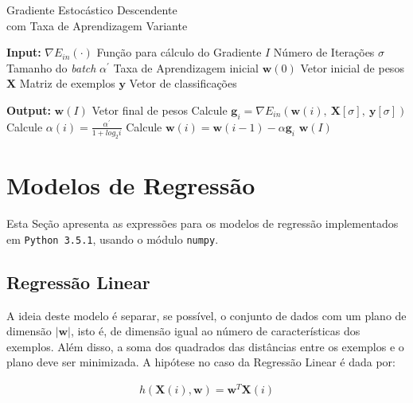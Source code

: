 \documentclass[a4paper, 12pt]{article}
\begin{document}
\begin{algorithm}[htpb]
    \caption{Gradiente Estocástico Descendente \\ com Taxa de Aprendizagem Variante}
    \label{alg:GSD}
    \begin{algorithmic}[1]
        \Statex \item[\textbf{Input:}]
        \Statex $\nabla{}E_{in}(\cdot)$ \Comment Função para cálculo do Gradiente
        \Statex $I$ \Comment Número de Iterações
        \Statex $\sigma$ \Comment Tamanho do \textit{batch}
        \Statex $\alpha^{\prime}$ \Comment Taxa de Aprendizagem inicial
        \Statex $\textbf{w}(0)$ \Comment Vetor inicial de pesos
        \Statex $\textbf{X}$ \Comment Matriz de exemplos
        \Statex $\textbf{y}$ \Comment Vetor de classificações
        \Statex \item[\textbf{Output:}]
        \Statex $\textbf{w}(I)$ \Comment Vetor final de pesos
        \Statex
        \State Calcule $\textbf{g}_i = \nabla{}E_{in}(\textbf{w}(i),\: \textbf{X}[\sigma],\: \textbf{y}[\sigma])$
        \State Calcule $\alpha(i) = \frac{\alpha^{\prime}}{1 + log_{2}i}$
        \State Calcule $\textbf{w}(i) = \textbf{w}(i -1) - \alpha{}\textbf{g}_i$
        \EndFor
        \State \Return $\textbf{w}(I)$
    \end{algorithmic}
\end{algorithm}


\section{Modelos de Regressão} \label{sec:regr}

Esta Seção apresenta as expressões para os modelos de regressão implementados
em \texttt{Python 3.5.1}, usando o módulo \texttt{numpy}.

\subsection{Regressão Linear}

A ideia deste modelo é separar, se possível, o conjunto de dados com um plano
de dimensão $|\textbf{w}|$, isto é, de dimensão igual ao número de
características dos exemplos. Além disso, a soma dos quadrados das distâncias
entre os exemplos e o plano deve ser minimizada.
A hipótese no caso da Regressão Linear é dada por:

\begin{align*}
    h(\textbf{X}(i),\textbf{w}) = \textbf{w}^{T}\textbf{X}(i)
\end{align*}
\end{document}
